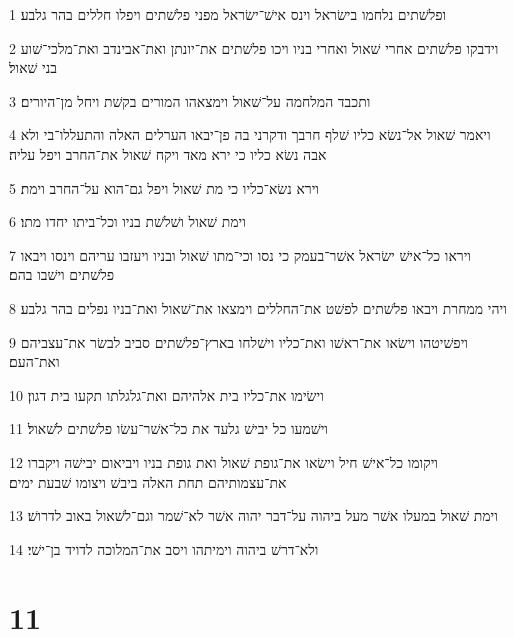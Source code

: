 \par 1 ופלשׁתים נלחמו בישׂראל וינס אישׁ־ישׂראל מפני פלשׁתים ויפלו חללים בהר גלבע׃
\par 2 וידבקו פלשׁתים אחרי שׁאול ואחרי בניו ויכו פלשׁתים את־יונתן ואת־אבינדב ואת־מלכי־שׁוע בני שׁאול׃
\par 3 ותכבד המלחמה על־שׁאול וימצאהו המורים בקשׁת ויחל מן־היורים׃
\par 4 ויאמר שׁאול אל־נשׂא כליו שׁלף חרבך ודקרני בה פן־יבאו הערלים האלה והתעללו־בי ולא אבה נשׂא כליו כי ירא מאד ויקח שׁאול את־החרב ויפל עליה׃
\par 5 וירא נשׂא־כליו כי מת שׁאול ויפל גם־הוא על־החרב וימת׃
\par 6 וימת שׁאול ושׁלשׁת בניו וכל־ביתו יחדו מתו׃
\par 7 ויראו כל־אישׁ ישׂראל אשׁר־בעמק כי נסו וכי־מתו שׁאול ובניו ויעזבו עריהם וינסו ויבאו פלשׁתים וישׁבו בהם׃
\par 8 ויהי ממחרת ויבאו פלשׁתים לפשׁט את־החללים וימצאו את־שׁאול ואת־בניו נפלים בהר גלבע׃
\par 9 ויפשׁיטהו וישׂאו את־ראשׁו ואת־כליו וישׁלחו בארץ־פלשׁתים סביב לבשׂר את־עצביהם ואת־העם׃
\par 10 וישׂימו את־כליו בית אלהיהם ואת־גלגלתו תקעו בית דגון׃
\par 11 וישׁמעו כל יבישׁ גלעד את כל־אשׁר־עשׂו פלשׁתים לשׁאול׃
\par 12 ויקומו כל־אישׁ חיל וישׂאו את־גופת שׁאול ואת גופת בניו ויביאום יבישׁה ויקברו את־עצמותיהם תחת האלה ביבשׁ ויצומו שׁבעת ימים׃
\par 13 וימת שׁאול במעלו אשׁר מעל ביהוה על־דבר יהוה אשׁר לא־שׁמר וגם־לשׁאול באוב לדרושׁ׃
\par 14 ולא־דרשׁ ביהוה וימיתהו ויסב את־המלוכה לדויד בן־ישׁי׃

\chapter{11}

